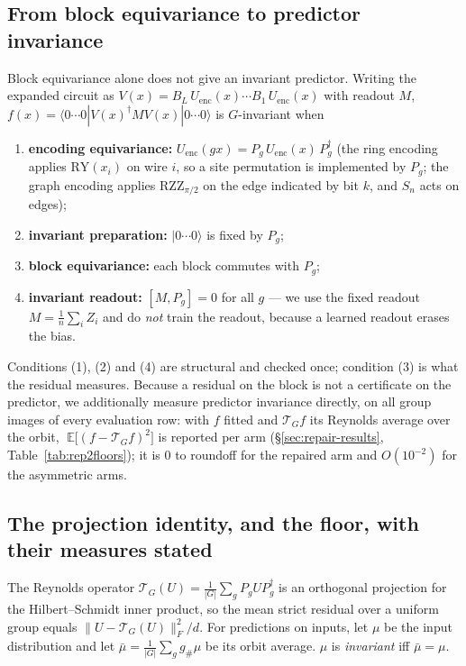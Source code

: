 \documentclass{neurips_2024}
\newcommand{\Tg}{\mathcal{T}_G}
\begin{document}
\subsection{From block equivariance to predictor invariance}
\label{sec:conditions}

Block equivariance alone does not give an invariant predictor. Writing the expanded
circuit as $V(x)=B_L\,U_{\mathrm{enc}}(x)\cdots B_1\,U_{\mathrm{enc}}(x)$ with readout
$M$, $f(x)=\langle 0\cdots0|V(x)^{\dagger} M V(x)|0\cdots0\rangle$ is $G$-invariant when
\begin{enumerate}[leftmargin=1.4em,itemsep=1pt,topsep=1pt]
  \item \textbf{encoding equivariance:} $U_{\mathrm{enc}}(gx)=P_g\,U_{\mathrm{enc}}(x)\,
        P_g^{\dagger}$ (the ring encoding applies $\mathrm{RY}(x_i)$ on wire $i$, so a site
        permutation is implemented by $P_g$; the graph encoding applies
        $\mathrm{RZZ}_{\pi/2}$ on the edge indicated by bit $k$, and $S_n$ acts on edges);
  \item \textbf{invariant preparation:} $\lvert 0\cdots0\rangle$ is fixed by $P_g$;
  \item \textbf{block equivariance:} each block commutes with $P_g$;
  \item \textbf{invariant readout:} $[M,P_g]=0$ for all $g$ --- we use the fixed readout
        $M=\frac1n\sum_i Z_i$ and do \emph{not} train the readout, because a learned
        readout erases the bias.
\end{enumerate}
Conditions (1), (2) and (4) are structural and checked once; condition (3) is what the
residual measures. Because a residual on the block is not a certificate on the predictor,
we additionally measure predictor invariance directly, on all group images of every
evaluation row: with $f$ fitted and $\Tg f$ its Reynolds average over the orbit,
$\;\mathbb{E}\bigl[(f-\Tg f)^2\bigr]$ is reported per arm
(\S\ref{sec:repair-results}, Table~\ref{tab:rep2floors}); it is $0$ to roundoff for the repaired
arm and $O(10^{-2})$ for the asymmetric arms.

\subsection{The projection identity, and the floor, with their measures stated}
\label{sec:floor}

The Reynolds operator $\Tg(U)=\frac{1}{|G|}\sum_{g}P_g U P_g^{\dagger}$ is an orthogonal
projection for the Hilbert--Schmidt inner product, so the mean strict residual over a
uniform group equals $\lVert U-\Tg(U)\rVert_F^2/d$. For predictions on inputs, let $\mu$
be the input distribution and let $\bar\mu=\frac1{|G|}\sum_g g_\#\mu$ be its orbit
average. $\mu$ is \emph{invariant} iff $\bar\mu=\mu$.
\end{document}

